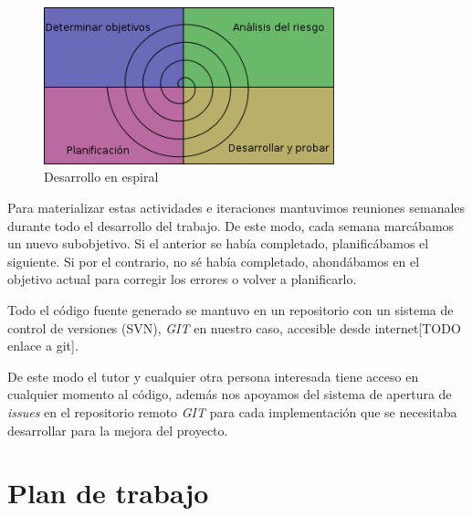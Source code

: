 \begin{figure}[h]
    \centering
    \includegraphics[width=0.75\textwidth]{img/metodologia_espiral}
    \caption{Desarrollo en espiral}
    \label{fig:espira}
\end{figure}

Para materializar estas actividades e iteraciones mantuvimos reuniones semanales durante todo el desarrollo del trabajo. De este modo, cada semana marcábamos un nuevo subobjetivo. Si el anterior se había completado, planificábamos el siguiente. Si por el contrario, no sé había completado, ahondábamos en el objetivo actual para corregir los errores o volver a planificarlo.

Todo el código fuente generado se mantuvo en un repositorio con un sistema de control de versiones (SVN), \textit{GIT} en nuestro caso, accesible desde internet[TODO enlace a git].

De este modo el tutor y cualquier otra persona interesada tiene acceso en cualquier momento al código, además nos apoyamos del sistema de apertura de \textit{issues} en el repositorio remoto \textit{GIT} para cada implementación que se necesitaba desarrollar para la mejora del proyecto. 

\section{Plan de trabajo}
\label{sec:plan}

